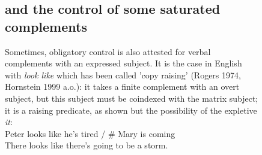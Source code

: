 \documentclass[output=paper
                ,modfonts
                ,nonflat
	        ,collection
	        ,collectionchapter
	        ,collectiontoclongg
 	        ,biblatex
                ,babelshorthands
                ,newtxmath
                ,draftmode
                ,colorlinks, citecolor=brown
]{./langsci/langscibook}
\begin{document}
\begin{figure}


\subsection{\xarg and the control of some saturated complements}

Sometimes, obligatory control is also attested for verbal complements with an expressed subject. It is the case in English with \emph{look like} which has been called 'copy raising' (Rogers 1974, Hornstein 1999 a.o.): it takes a finite complement with an overt subject, but this subject must be coindexed with the matrix subject; it is a raising predicate, as shown but the possibility of the expletive \emph{it}:\\

Peter looks like he's tired / # Mary is coming\\
There looks like there's going to be a storm. \citep[ex 17]{Sag2007}\\


\end{figure}
\end{document}
